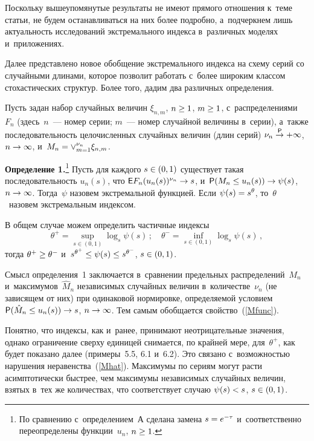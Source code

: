 \begin{multicols}{2}
Поскольку вышеупомянутые результаты не имеют прямого отношения к~теме статьи,
не будем останавливаться
на них более подробно, а~подчеркнем лишь актуальность исследований
экстремального индекса в~различных моделях и~приложениях.

Далее представлено новое обобщение экстремального индекса на схему серий со случайными
длинами, которое позволит работать с~более широким классом стохастических структур.
Более того, дадим два различных определения.

Пусть задан набор случайных величин $\xi_{n,m}$, $n\hm\ge 1$, $m\hm\ge 1$,
с~распределениями~$F_n$ (здесь~$n$~--- номер серии; $m$~---
номер случайной величины в~серии),
а~также последовательность целочисленных случайных величин (длин серий)
$\nu_n\stackrel{{\sf P}}{\to}\hm+\infty$, $n\hm\to\infty$,
и~$M_n\hm=\vee_{m=1}^{\nu_n}\xi_{n,m}$.

\smallskip

\noindent
\textbf{Определение 1.}\footnote{По сравнению с~определением~А сделана замена
$s\hm=e^{-\tau}$
и~соответственно переопределены функции~$u_n$, $n\hm\ge 1$.}
Пусть для каждого $s\hm\in (0,1)$ существует такая последовательность $u_n(s)$,
что ${\sf E}F_n(u_n(s))^{\nu_n}\to s$, и~${\sf P}(M_n\hm\le u_n(s))\hm\to\psi(s)$,
$n\hm\to\infty$.
Тогда~$\psi$ назовем экстремальной функцией.
Если $\psi(s)\hm=s^\theta$, то~$\theta$~назовем экстремальным индексом.

\smallskip

В общем случае можем определить частичные индексы
$$
\theta^+=\sup\limits_{s\in (0,1)}\log_s\psi(s)\,;\quad
\theta^-=\inf\limits_{s\in (0,1)}\log_s\psi(s)\,,
$$
тогда $\theta^+\hm\ge \theta^-$ и~$s^{\theta^+}\hm\le\psi(s)\hm\le s^{\theta^-}$,
$s\hm\in (0,1)$.

Смысл определения~1 заключается в~сравнении предельных распределений~$M_n$
и~максимумов~${\hat M}_n$ независимых случайных величин в~количестве~$\nu_n$
(не зависящем от них)
при одинаковой нормировке, определяемой условием
${\sf P}({\hat M}_n\hm\le u_n(s))\hm\to s$, $n\hm\to\infty$.
Тем самым обобщается свойство~(\ref{Mfunc}).

Понятно, что индексы, как и~ранее, принимают неотрицательные значения, однако ограничение
сверху единицей снимается, по крайней мере, для~$\theta^+$, как будет показано далее
(примеры~5.5, 6.1 и~6.2).
Это связано с~возможностью нарушения неравенства~(\ref{Mhat}).
Максимумы по сериям могут расти асимптотически быстрее,
чем максимумы независимых случайных величин, взятых в~тех же количествах,
что соответствует случаю $\psi(s)\hm<s$, $s\hm\in (0,1)$.


\end{multicols}
